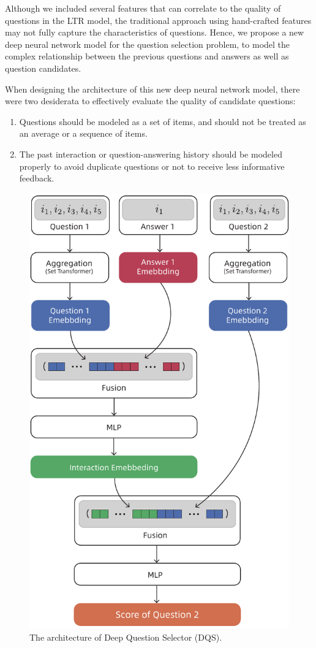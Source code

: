 Although we included several features that can correlate to the quality of questions
in the LTR model,
the traditional approach using hand-crafted features may not fully 
capture the characteristics of questions. 
Hence, we propose a new deep neural network model for the question selection problem, to model the complex relationship between the previous questions and answers as well as question candidates. 

When designing the architecture of this new deep neural network model, 
there were two desiderata to effectively evaluate the quality of candidate questions:
\begin{enumerate}
    \item Questions should be modeled as a set of items, 
    and should not be treated as an average or a sequence of items.
    \item The past interaction or question-answering history should be modeled properly to avoid duplicate questions or not to receive less informative feedback. 
\end{enumerate}

\begin{figure}
  \centering
  \includegraphics[width=0.6\linewidth]{figures/dqs.pdf}
  \caption{The architecture of Deep Question Selector (DQS).}
  \label{deep-model}
\end{figure}

